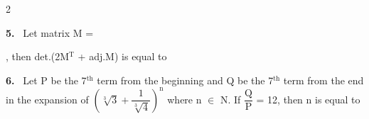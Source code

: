 \documentclass[10pt]{extarticle}
\newcommand{\qn}[1]{\par\smallskip\noindent\textbf{#1.}~}
\begin{document}
\begin{multicols}{2}
\qn{5} Let matrix M = \par\noindent{}\par , then det.(2M$^\text{T}$ + adj.M) is equal to
\qn{6} Let P be the 7$^\text{th}$ term from the beginning and Q be the 7$^\text{th}$ term from the end in the expansion of $\left(\sqrt[3]{3}+\dfrac{1}{\sqrt[3]{4}}\right)^\text{n}$ where n $\in$ N. If $\dfrac{\text{Q}}{\text{P}}$ = 12, then n is equal to
\end{multicols}
\end{document}
